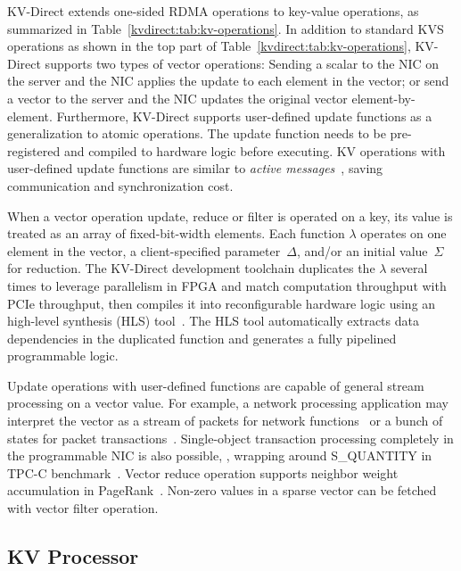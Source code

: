 KV-Direct extends one-sided RDMA operations to key-value operations, as summarized in Table~\ref{kvdirect:tab:kv-operations}.
In addition to standard KVS operations as shown in the top part of Table~\ref{kvdirect:tab:kv-operations}, KV-Direct supports two types of vector operations:
Sending a scalar to the NIC on the server and the NIC applies the update to each element in the vector; or send a vector to the server and the NIC updates the original vector element-by-element.
Furthermore, KV-Direct supports user-defined update functions as a generalization to atomic operations.
The update function needs to be pre-registered and compiled to hardware logic before executing.
KV operations with user-defined update functions are similar to \textit{active messages}~\cite{eicken1992active}, saving communication and synchronization cost.

When a vector operation update, reduce or filter is operated on a key, its value is treated as an array of fixed-bit-width elements.
Each function $\lambda$ operates on one element in the vector, a client-specified parameter~$\Delta$, and/or an initial value~$\Sigma$ for reduction.
The KV-Direct development toolchain duplicates the $\lambda$ several times to leverage parallelism in FPGA and match computation throughput with PCIe throughput, then compiles it into reconfigurable hardware logic using an high-level synthesis (HLS) tool~\cite{aoc}.
The HLS tool automatically extracts data dependencies in the duplicated function and generates a fully pipelined programmable logic.

Update operations with user-defined functions are capable of general stream processing on a vector value.
For example, a network processing application may interpret the vector as a stream of packets for network functions~\cite{li2016clicknp} or a bunch of states for packet transactions~\cite{sivaraman2016packet}.
Single-object transaction processing completely in the programmable NIC is also possible, \eg, wrapping around S\_QUANTITY in TPC-C benchmark~\cite{council2010tpc}.
Vector reduce operation supports neighbor weight accumulation in PageRank~\cite{page1999pagerank}.
Non-zero values in a sparse vector can be fetched with vector filter operation.

\subsection{KV Processor}
\label{kvdirect:sec:kv-processor}

